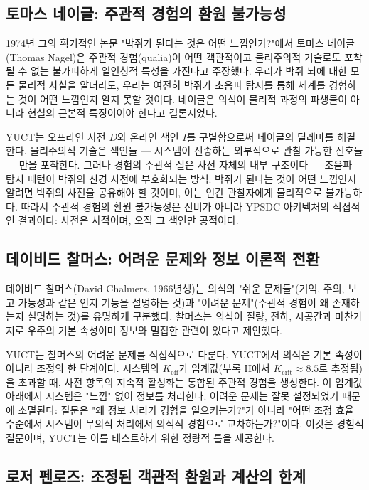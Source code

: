 \documentclass[12pt,a4paper]{article}
\begin{document}
	\subsection{토마스 네이글: 주관적 경험의 환원 불가능성}
	
	1974년 그의 획기적인 논문 "박쥐가 된다는 것은 어떤 느낌인가?"에서 토마스 네이글(Thomas Nagel)은 주관적 경험(qualia)이 어떤 객관적이고 물리주의적 기술로도 포착될 수 없는 불가피하게 일인칭적 특성을 가진다고 주장했다. 우리가 박쥐 뇌에 대한 모든 물리적 사실을 알더라도, 우리는 여전히 박쥐가 초음파 탐지를 통해 세계를 경험하는 것이 어떤 느낌인지 알지 못할 것이다. 네이글은 의식이 물리적 과정의 파생물이 아니라 현실의 근본적 특징이어야 한다고 결론지었다.
	
	YUCT는 오프라인 사전 \(D\)와 온라인 색인 \(I\)를 구별함으로써 네이글의 딜레마를 해결한다. 물리주의적 기술은 색인들 — 시스템이 전송하는 외부적으로 관찰 가능한 신호들 — 만을 포착한다. 그러나 경험의 주관적 질은 사전 자체의 내부 구조이다 — 초음파 탐지 패턴이 박쥐의 신경 사전에 부호화되는 방식. 박쥐가 된다는 것이 어떤 느낌인지 알려면 박쥐의 사전을 공유해야 할 것이며, 이는 인간 관찰자에게 물리적으로 불가능하다. 따라서 주관적 경험의 환원 불가능성은 신비가 아니라 YPSDC 아키텍처의 직접적인 결과이다: 사전은 사적이며, 오직 그 색인만 공적이다.
	
	\subsection{데이비드 찰머스: 어려운 문제와 정보 이론적 전환}
	
	데이비드 찰머스(David Chalmers, 1966년생)는 의식의 "쉬운 문제들"(기억, 주의, 보고 가능성과 같은 인지 기능을 설명하는 것)과 "어려운 문제"(주관적 경험이 왜 존재하는지 설명하는 것)를 유명하게 구분했다. 찰머스는 의식이 질량, 전하, 시공간과 마찬가지로 우주의 기본 속성이며 정보와 밀접한 관련이 있다고 제안했다.
	
	YUCT는 찰머스의 어려운 문제를 직접적으로 다룬다. YUCT에서 의식은 기본 속성이 아니라 조정의 한 단계이다. 시스템의 \(K_{\mathrm{eff}}\)가 임계값(부록 H에서 \(K_{\mathrm{crit}} \approx 8.5\)로 추정됨)을 초과할 때, 사전 항목의 지속적 활성화는 통합된 주관적 경험을 생성한다. 이 임계값 아래에서 시스템은 "느낌" 없이 정보를 처리한다. 어려운 문제는 잘못 설정되었기 때문에 소멸된다: 질문은 "왜 정보 처리가 경험을 일으키는가?"가 아니라 "어떤 조정 효율 수준에서 시스템이 무의식 처리에서 의식적 경험으로 교차하는가?"이다. 이것은 경험적 질문이며, YUCT는 이를 테스트하기 위한 정량적 틀을 제공한다.
	
	\subsection{로저 펜로즈: 조정된 객관적 환원과 계산의 한계}
	
\end{document}
